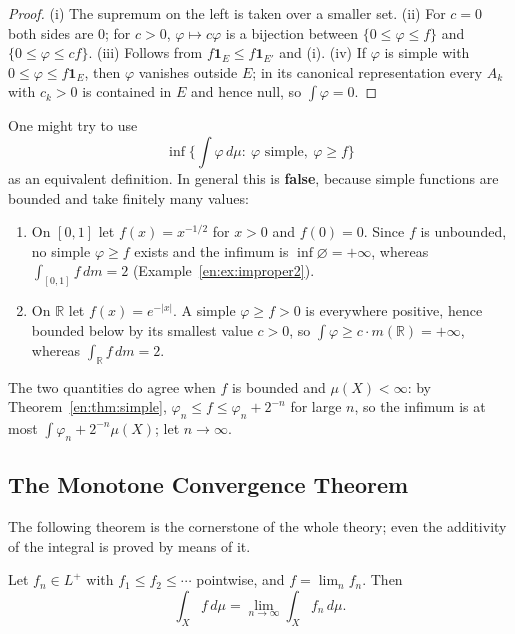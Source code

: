 \documentclass[11pt]{article}
\makeatletter
\newcommand{\envlabel}[1]{\protected@edef\@currentlabel{\themathenv}\label{#1}}
\makeatother
\begin{document}
\begin{proof}
(i) The supremum on the left is taken over a smaller set. (ii) For $c=0$ both sides are $0$; for $c>0$, $\varphi\mapsto c\varphi$ is a bijection between $\{0\leq\varphi\leq f\}$ and $\{0\leq\varphi\leq cf\}$. (iii) Follows from $f\mathbf{1}_{E}\leq f\mathbf{1}_{E'}$ and (i). (iv) If $\varphi$ is simple with $0\leq\varphi\leq f\mathbf{1}_{E}$, then $\varphi$ vanishes outside $E$; in its canonical representation every $A_{k}$ with $c_{k}>0$ is contained in $E$ and hence null, so $\int\varphi=0$.
\end{proof}

\begin{remark}\envlabel{en:rem:upper}
One might try to use
\[
\inf\Big\{\int\varphi\,d\mu:\ \varphi\text{ simple},\ \varphi\geq f\Big\}
\]
as an equivalent definition. In general this is \textbf{false}, because simple functions are bounded and take finitely many values:
\begin{enumerate}
  \item On $[0,1]$ let $f(x)=x^{-1/2}$ for $x>0$ and $f(0)=0$. Since $f$ is unbounded, no simple $\varphi\geq f$ exists and the infimum is $\inf\varnothing=+\infty$, whereas $\int_{[0,1]}f\,dm=2$ (Example~\ref{en:ex:improper2}).
  \item On $\mathbb{R}$ let $f(x)=e^{-|x|}$. A simple $\varphi\geq f>0$ is everywhere positive, hence bounded below by its smallest value $c>0$, so $\int\varphi\geq c\cdot m(\mathbb{R})=+\infty$, whereas $\int_{\mathbb{R}}f\,dm=2$.
\end{enumerate}
The two quantities do agree when $f$ is bounded and $\mu(X)<\infty$: by Theorem~\ref{en:thm:simple}, $\varphi_{n}\leq f\leq\varphi_{n}+2^{-n}$ for large $n$, so the infimum is at most $\int\varphi_{n}+2^{-n}\mu(X)$; let $n\to\infty$.
\end{remark}

\subsection{The Monotone Convergence Theorem}

The following theorem is the cornerstone of the whole theory; even the additivity of the integral is proved by means of it.

\begin{theorem}\envlabel{en:thm:mct}
Let $f_{n}\in L^{+}$ with $f_{1}\leq f_{2}\leq\cdots$ pointwise, and $f=\lim_{n}f_{n}$. Then
\[
\int_{X}f\,d\mu=\lim_{n\to\infty}\int_{X}f_{n}\,d\mu.
\]
\end{theorem}
\end{document}

